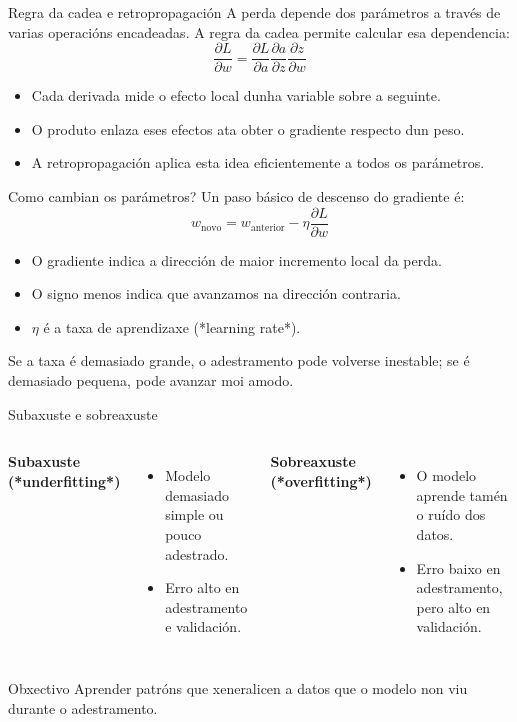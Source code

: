 \documentclass[aspectratio=169,10pt]{beamer}
\begin{document}
\begin{frame}{Regra da cadea e retropropagación}
  A perda depende dos parámetros a través de varias operacións encadeadas. A regra da cadea permite calcular esa dependencia:
  \[
    \frac{\partial L}{\partial w}
    =
    \frac{\partial L}{\partial a}
    \frac{\partial a}{\partial z}
    \frac{\partial z}{\partial w}
  \]
  \begin{itemize}
    \item Cada derivada mide o efecto local dunha variable sobre a seguinte.
    \item O produto enlaza eses efectos ata obter o gradiente respecto dun peso.
    \item A retropropagación aplica esta idea eficientemente a todos os parámetros.
  \end{itemize}
\end{frame}

\begin{frame}{Como cambian os parámetros?}
  Un paso básico de descenso do gradiente é:
  \[
    w_{\text{novo}}=w_{\text{anterior}}-\eta\frac{\partial L}{\partial w}
  \]
  \begin{itemize}
    \item O gradiente indica a dirección de maior incremento local da perda.
    \item O signo menos indica que avanzamos na dirección contraria.
    \item \(\eta\) é a taxa de aprendizaxe (*learning rate*).
  \end{itemize}
  Se a taxa é demasiado grande, o adestramento pode volverse inestable; se é demasiado pequena, pode avanzar moi amodo.
\end{frame}

\begin{frame}{Subaxuste e sobreaxuste}
  \begin{columns}[T]
      \textbf{Subaxuste (*underfitting*)}
      \begin{itemize}
        \item Modelo demasiado simple ou pouco adestrado.
        \item Erro alto en adestramento e validación.
      \end{itemize}
      \textbf{Sobreaxuste (*overfitting*)}
      \begin{itemize}
        \item O modelo aprende tamén o ruído dos datos.
        \item Erro baixo en adestramento, pero alto en validación.
      \end{itemize}
  \end{columns}
  \begin{block}{Obxectivo}
    Aprender patróns que xeneralicen a datos que o modelo non viu durante o adestramento.
  \end{block}
\end{frame}
\end{document}

